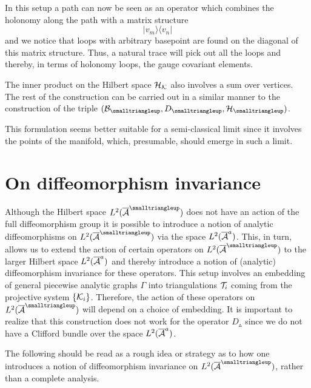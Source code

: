 \documentclass[12pt]{article}
\def\G{\Gamma}
\def\ca{{\cal A}}
\def\cb{{\cal B}}
\def\ch{{\cal H}}
\def\ck{{\cal K}}
\def\ct{{\cal T}}
\begin{document}
\begin{appendix}
In this setup a path can now be seen as an operator which combines the holonomy along the path with a matrix structure
\[
 | v_m\rangle\langle v_n |
\]
and we notice that loops with arbitrary basepoint are found on the diagonal of this matrix structure. Thus, a natural trace will pick out all the loops and thereby, in terms of holonomy loops, the gauge covariant elements.



The inner product on the Hilbert space $\ch_\ck$ also involves a sum over vertices. The rest of the construction can be carried out in a similar manner to the construction of the triple $(\cb_{\smalltriangleup},D_{\smalltriangleup},\ch_\smalltriangleup)$.





This formulation seems better suitable for a semi-classical limit since it involves the points of the manifold, which, presumable, should emerge in such a limit. 










\section{On diffeomorphism invariance}
\label{DIFFinva}

Although the Hilbert space $L^2(\overline{\ca}^{\smalltriangleup})$ does not have an action of the full diffeomorphism group it is possible to introduce a notion of analytic diffeomorphisms on $L^2(\overline{\ca}^{\smalltriangleup})$ via the space $L^2(\overline{\ca}^{\small a})$. This, in turn, allows us to extend the action of certain operators on $L^2(\overline{\ca}^{\smalltriangleup})$ to the larger Hilbert space $L^2(\overline{\ca}^{\small a})$ and thereby introduce a notion of (analytic) diffeomorphism invariance for these operators. This setup involves an embedding of general piecewise analytic graphs $\G$ into triangulations $\ct_i$ coming from the projective system $\{\ck_i\}$. Therefore, the action of these operators on $L^2(\overline{\ca}^{\smalltriangleup})$ will depend on a choice of embedding. It is important to realize that this construction does not work for the operator $D_{\smalltriangleup}$ since we do not have a Clifford bundle over the space $L^2(\overline{\ca}^{\small a})$. 

The following should be read as a rough idea or strategy as to how one introduces a notion of diffeomorphism invariance on $L^2(\overline{\ca}^{\smalltriangleup})$, rather than a complete analysis.




\end{appendix}
\end{document}
